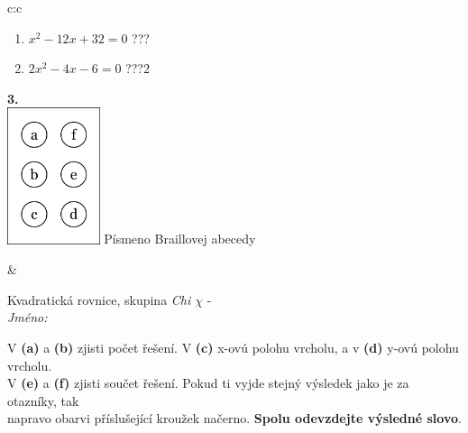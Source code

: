 \documentclass[10pt]{report}
\begin{document}
\begin{tabular}{c:c}
\begin{minipage}[c][104.5mm][t]{0.5\linewidth}
\begin{center}
\begin{minipage}{0.79\linewidth}
\begin{center}
\begin{varwidth}{\linewidth}
\begin{enumerate}
\item $x^2-12x+32=0$\quad \dotfill\; ???\;\dotfill {}
\item $2x^2-4x-6=0$\quad \dotfill\; ???\;\dotfill \quad $2$
\end{enumerate}
\end{varwidth}
\end{center}
\end{minipage}
\begin{minipage}{0.20\linewidth}
\begin{center}
{\Huge\bfseries 3.} \\[2mm]
\includegraphics[height=40mm]{../images/braille.png}
{\small Písmeno Braillovej abecedy}
\end{center}
\end{minipage}
\end{center}
\end{minipage}
&
\begin{minipage}[c][104.5mm][t]{0.5\linewidth}
\begin{center}
\vspace{7mm}
{\huge Kvadratická rovnice, skupina \textit{Chi $\chi$} -}\\[5mm]
\textit{Jméno:}\phantom{xxxxxxxxxxxxxxxxxxxxxxxxxxxxxxxxxxxxxxxxxxxxxxxxxxxxxxxxxxxxxxxxx}\\[5mm]
\begin{minipage}{0.95\linewidth}
\begin{center}
V \textbf{(a)} a \textbf{(b)} zjisti počet řešení. V \textbf{(c)} x-ovú polohu vrcholu, a v \textbf{(d)} y-ovú polohu vrcholu.\\V \textbf{(e)} a \textbf{(f)} zjisti součet řešení. Pokud ti vyjde stejný výsledek jako je za otazníky, tak\\napravo obarvi příslušející kroužek načerno. \textbf{Spolu odevzdejte výsledné slovo}.
\end{center}
\end{minipage}
\\[1mm]
\begin{minipage}{0.79\linewidth}
\begin{center}

\end{center}
\end{minipage}
\end{center}
\end{minipage}
\end{tabular}
\end{document}

